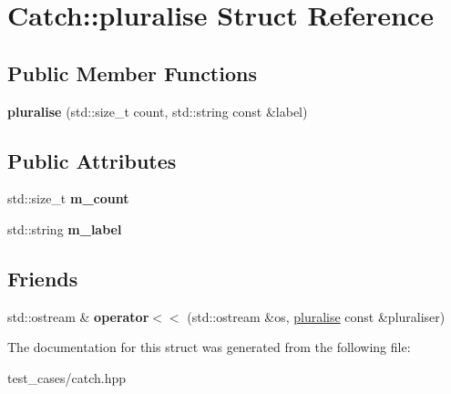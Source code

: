 \hypertarget{structCatch_1_1pluralise}{}\section{Catch\+:\+:pluralise Struct Reference}
\label{structCatch_1_1pluralise}
\subsection*{Public Member Functions}
\begin{DoxyCompactItemize}
\item 
\mbox{\label{structCatch_1_1pluralise_a5c55e22de2416cfe416edf715c6b9234}} 
{\bfseries pluralise} (std\+::size\+\_\+t count, std\+::string const \&label)
\end{DoxyCompactItemize}
\subsection*{Public Attributes}
\begin{DoxyCompactItemize}
\item 
\mbox{\label{structCatch_1_1pluralise_a4dce2fa13ec6f00fac09b2418265441e}} 
std\+::size\+\_\+t {\bfseries m\+\_\+count}
\item 
\mbox{\label{structCatch_1_1pluralise_a8849cbdd3f11ebe7747597c8644e8793}} 
std\+::string {\bfseries m\+\_\+label}
\end{DoxyCompactItemize}
\subsection*{Friends}
\begin{DoxyCompactItemize}
\item 
\mbox{\label{structCatch_1_1pluralise_aa7dac6b165514c1f85e0695d678fdef5}} 
std\+::ostream \& {\bfseries operator$<$$<$} (std\+::ostream \&os, \hyperlink{structCatch_1_1pluralise}{pluralise} const \&pluraliser)
\end{DoxyCompactItemize}


The documentation for this struct was generated from the following file\+:\begin{DoxyCompactItemize}
\item 
test\+\_\+cases/catch.\+hpp\end{DoxyCompactItemize}
